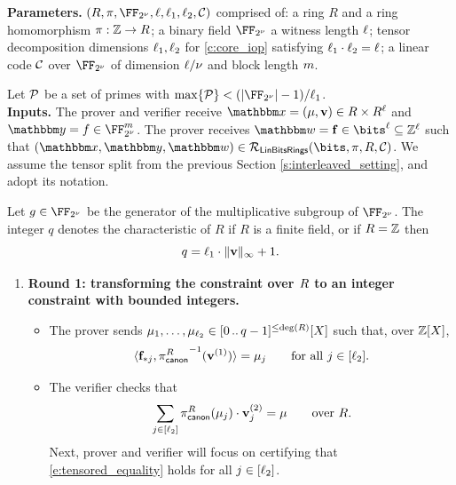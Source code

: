 \documentclass[11pt,letterpaper,usenames,dvipsnames]{article}
\begin{document}
\begin{construction}\label{c:core_iop}
\noindent \textbf{Parameters.} $(R,\ringmorphism, \comfield,\codedim,\codedim_1,\codedim_2,\cC)$ comprised of: a ring $R$ and a ring homomorphism $\pi: \mathbb{Z}\to R$; a binary field $\comfield$ a witness length $\ell$; tensor decomposition dimensions $\ell_1, \ell_2$ for \cref{c:core_iop} satisfying $\ell_1\cdot \ell_2 = \ell$; a linear code $\mathcal{C}$ over $\comfield$ of dimension $\ell/\nu$ and block length $m$. 

Let $\mathcal{P}$ be a set of primes with $\max\{\cP\}< (|\comfield|-1)/\codedim_1$.
\\

\noindent \textbf{Inputs.} The prover and verifier receive $\inp=(\mu, \vv)\in \evalfield \times \evalfield^{\codedim}$ and  $\oracle= f \in \comfield^\codelength$. The prover receives $\wit= \bff\in \bits^\codedim \subseteq \ZZ^\codedim$ such that $(\inp,\oracle, \wit) \in \LinBitsDual(\bits,\ringmorphism, \evalfield,\cC)$.  We assume the tensor split from the previous Section \ref{s:interleaved_setting}, and adopt its notation. 


Let $\basegenerator\in \comfield$ be the generator of the multiplicative subgroup of $\comfield$.   The integer $q$ denotes the characteristic of $R$ if $R$ is a finite field, or if $R=\mathbb{Z}$ then
\begin{equation}\label{e:q_definition_if_R_is_Z}
q = \ell_1 \cdot \lVert \mathbf{v} \rVert_\infty +1.
\end{equation}


\begin{enumerate}[leftmargin=*] 
\item \textbf{Round 1: transforming the constraint over $R$ to an integer constraint with bounded integers.} 
\begin{itemize}[leftmargin=*]
    \item The prover sends $\mu_1, \ldots, \mu_{\ell_2}\in [0 \, .. \, q-1]^{\leq \deg(R)}[X]$ such that, over $\mathbb{Z}[X]$, \begin{equation}\label{e:tensored_equality}\langle \mathbf{f}_{*j}, {\pi_{\mathsf{canon}}^R}^{-1}(\mathbf{v}^{(1)})\rangle = \mu_j \qquad \text{for all } j\in [\ell_2].\end{equation} 
\item The verifier checks that \begin{equation}\label{e:tensor_decomposition_reconstruction}\sum_{j\in [\ell_2]} {\pi_{\mathsf{canon}}^R}(\mu_j)\cdot \mathbf{v}_j^{(2)}  = \mu\qquad \text{over } R.\end{equation} 
Next, prover and verifier will focus on certifying that \eqref{e:tensored_equality} holds for all $j\in [\ell_2]$.


\end{itemize}
\end{enumerate}
\end{construction}
\end{document}
